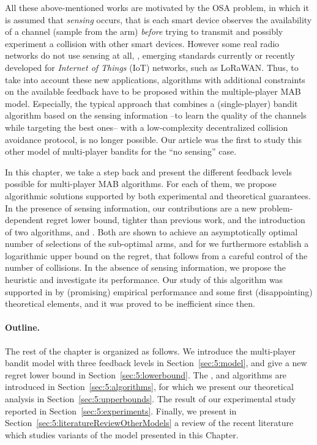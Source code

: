 All these above-mentioned works are motivated by the OSA problem, in which it is assumed that \emph{sensing} occurs, that is each smart device observes the availability of a channel (sample from the arm) \emph{before} trying to transmit and possibly experiment a collision with other smart devices.
However some real radio networks do not use sensing at all, \eg, emerging standards currently or recently developed for \emph{Internet of Things} (IoT) networks, such as LoRaWAN.
Thus, to take into account these new applications, algorithms with additional constraints on the available feedback have to be proposed within the multiple-player MAB model.
Especially, the typical approach that combines a (single-player) bandit algorithm based on the sensing information --to learn the quality of the channels while targeting the best ones-- with a low-complexity decentralized collision avoidance protocol, is no longer possible.
Our article \cite{Besson2018ALT} was the first to study this other model of multi-player bandits for the ``no sensing'' case.

In this chapter, we take a step back and present the different feedback levels possible for multi-player MAB algorithms. For each of them, we propose algorithmic solutions supported by both experimental and theoretical guarantees. In the presence of sensing information, our contributions are a new problem-dependent regret lower bound, tighter than previous work, and the introduction of two algorithms, \RandTopM{} and \MCTopM{}. Both are shown to achieve an asymptotically optimal number of selections of the sub-optimal arms, and for \MCTopM{} we furthermore establish a logarithmic upper bound on the regret, that follows from a careful control of the number of collisions. In the absence of sensing information, we propose the \Selfish{} heuristic and investigate its performance. Our study of this algorithm was supported in \cite{Besson2018ALT} by (promising) empirical performance and some first (disappointing) theoretical elements, and it was proved to be inefficient since then.



\paragraph{Outline.}
%
The rest of the chapter is organized as follows.
We introduce the multi-player bandit model with three feedback levels in Section~\ref{sec:5:model}, and give a new regret lower bound in Section~\ref{sec:5:lowerbound}.
The \RandTopM, \MCTopM{} and \Selfish{} algorithms are introduced in Section~\ref{sec:5:algorithms},
for which we present our theoretical analysis in Section~\ref{sec:5:upperbounds}.
The result of our experimental study reported in Section~\ref{sec:5:experiments}.
Finally, we present in Section~\ref{sec:5:literatureReviewOtherModels} a review of the recent literature which studies variants of the model presented in this Chapter.


